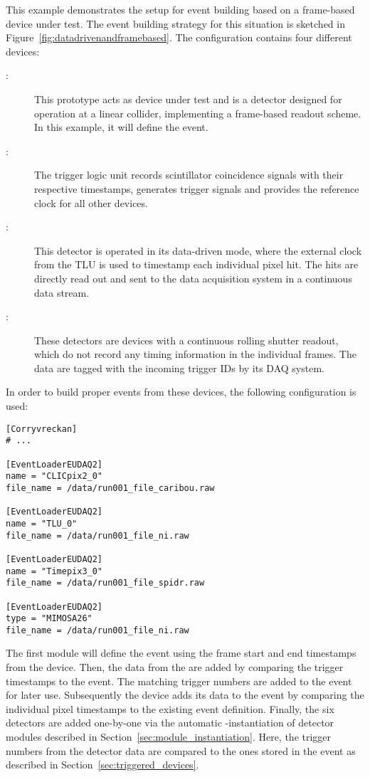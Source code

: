 This example demonstrates the setup for event building based on a frame-based device under test.
The event building strategy for this situation is sketched in Figure~\ref{fig:datadrivenandframebased}.
The configuration contains four different devices:
\begin{description}
        \item[:] This prototype acts as device under test and is a detector designed for operation at a linear collider, implementing a frame-based readout scheme. In this example, it will define the event.
        \item[:] The trigger logic unit records scintillator coincidence signals with their respective timestamps, generates trigger signals and provides the reference clock for all other devices.
        \item[:] This detector is operated in its data-driven mode, where the external clock from the TLU is used to timestamp each individual pixel hit. The hits are directly read out and sent to the data acquisition system in a continuous data stream.
        \item[:] These detectors are devices with a continuous rolling shutter readout, which do not record any timing information in the individual frames. The data are tagged with the incoming trigger IDs by its DAQ system.
\end{description}

In order to build proper events from these devices, the following configuration is used:

\begin{verbatim}
[Corryvreckan]
# ...

[EventLoaderEUDAQ2]
name = "CLICpix2_0"
file_name = /data/run001_file_caribou.raw

[EventLoaderEUDAQ2]
name = "TLU_0"
file_name = /data/run001_file_ni.raw

[EventLoaderEUDAQ2]
name = "Timepix3_0"
file_name = /data/run001_file_spidr.raw

[EventLoaderEUDAQ2]
type = "MIMOSA26"
file_name = /data/run001_file_ni.raw
\end{verbatim}

The first module will define the event using the frame start and end timestamps from the  device.
Then, the data from the  are added by comparing the trigger timestamps to the event.
The matching trigger numbers are added to the event for later use.
Subsequently the  device adds its data to the event by comparing the individual pixel timestamps to the existing event definition.
Finally, the six  detectors are added one-by-one via the automatic -instantiation of detector modules described in Section~\ref{sec:module_instantiation}.
Here, the trigger numbers from the detector data are compared to the ones stored in the event as described in Section~\ref{sec:triggered_devices}.

